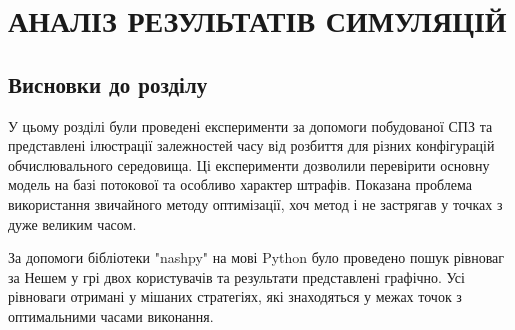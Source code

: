 
\chapter{АНАЛІЗ РЕЗУЛЬТАТІВ СИМУЛЯЦІЙ}





\section*{Висновки до розділу}

У цьому розділі були проведені експерименти за допомоги побудованої СПЗ та представлені ілюстрації залежностей часу від розбиття для різних конфігурацій обчислювального середовища. Ці експерименти дозволили перевірити основну модель на базі потокової та особливо характер штрафів. Показана проблема використання звичайного методу оптимізації, хоч метод і не застрягав у точках з дуже великим часом.

За допомоги бібліотеки "nashpy" на мові Python було проведено пошук рівноваг за Нешем у грі двох користувачів та результати представлені графічно. Усі рівноваги отримані у мішаних стратегіях, які знаходяться у межах точок з оптимальними часами виконання.